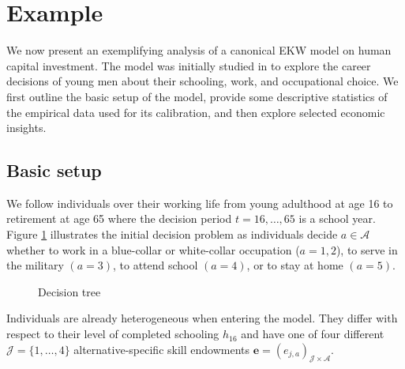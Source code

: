 \section{Example}\label{Example}
We now present an exemplifying analysis of a canonical EKW model on human capital investment. The model was initially studied in \citet{Keane.1997} to explore the career decisions of young men about their schooling, work, and occupational choice. We first outline the basic setup of the model, provide some descriptive statistics of the empirical data used for its calibration, and then explore selected economic insights.
\subsection{Basic setup}
We follow individuals over their working life from young adulthood at age 16 to retirement at age 65 where the decision period $t = 16, \dots, 65$  is a school year. Figure \ref{Decision tree} illustrates the initial decision problem as individuals decide $a\in\mathcal{A}$ whether to work in a blue-collar or white-collar occupation ($a = 1, 2$), to serve in the military $(a = 3)$, to attend school $(a = 4)$, or to stay at home $(a = 5)$.\\
%
\begin{figure}[h!]\centering
\caption{Decision tree}\label{Decision tree}
\scalebox{0.7}{}
\end{figure}\FloatBarrier\vspace{1.0cm}
%
\noindent Individuals are already heterogeneous when entering the model. They differ with respect to their level of completed schooling $h_{16}$ and have one of four different $\mathcal{J} = \{1, \hdots, 4\}$ alternative-specific skill endowments $\bm{e} = \left(e_{j,a}\right)_{\mathcal{J} \times \mathcal{A}}$.\\

